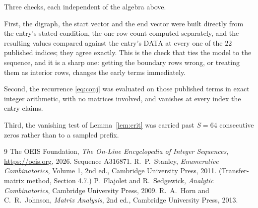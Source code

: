 \documentclass[11pt,a4paper]{article}
\theoremstyle{plain}
\theoremstyle{definition}
\begin{document}
Three checks, each independent of the algebra above.

First, the digraph, the start vector and the end vector were built directly from the
entry's stated condition, the one-row count computed separately, and the resulting values
compared against the entry's DATA at every one of the $22$ published indices; they
agree exactly. This is the check that ties the model to the sequence, and it is a sharp one:
getting the boundary rows wrong, or treating them as interior rows, changes the early terms
immediately.

Second, the recurrence \eqref{eq:conj} was evaluated on those published terms in exact
integer arithmetic, with no matrices involved, and vanishes at every index the entry claims.

Third, the vanishing test of Lemma~\ref{lem:crit} was carried past $S=64$ consecutive
zeros rather than to a sampled prefix.

\begin{thebibliography}{9}
 The OEIS Foundation, \emph{The On-Line Encyclopedia of Integer
Sequences}, \url{https://oeis.org}, 2026. Sequence A316871.
 R.~P.~Stanley, \emph{Enumerative Combinatorics}, Volume 1, 2nd ed.,
Cambridge University Press, 2011. (Transfer-matrix method, Section 4.7.)
 P.~Flajolet and R.~Sedgewick, \emph{Analytic Combinatorics}, Cambridge
University Press, 2009.
 R.~A.~Horn and C.~R.~Johnson, \emph{Matrix Analysis}, 2nd ed., Cambridge
University Press, 2013.
\end{thebibliography}
\end{document}
